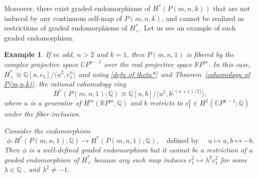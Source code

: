 \documentclass{amsart}
\newtheorem{example}[theorem]{Example}
\newcommand{\thmref}[1]{Theorem~\ref{#1}}
\begin{document}
	Moreover, there exist graded endomorphisms of $H^*(P(m,n,k))$ that are not induced by any continuous self-map of $P(m,n,k)$, and cannot be realized as restrictions of graded endomorphisms of $H^*_{\times}$. Let us see an example of such graded %
endomorphism.
	
	
	\begin{example}
		If $m$ odd, $n>2$ and $k = 1$, then $P(m,n,1)$ is fibered by the complex projective space  $\mathbb{C} P^{n-1}$ over the real projective space $\mathbb{R} P^m$. In this case,  $H^*_\times\cong \mathbb Q[u,c_1]/\langle u^2, c_1^n\rangle$ and using \eqref{defn of theta*}\ and \thmref{cohomology of P(m,n,k)}, the rational cohomology ring $$H^*(P(m,n,1); \mathbb{Q}) \cong \mathbb{Q}[u, b] / \langle u^2, b^{\lfloor (n+1)/2 \rfloor} \rangle,$$ where %
$u$ is a generator of $H^m(\mathbb{R}P^m;\mathbb Q)$ and $b$ restricts to $c_1^2\in H^2(\mathbb CP^{n-1};\mathbb Q)$ under the fiber inclusion. 
		
		Consider the endomorphism
		\[
		\phi \colon H^*(P(m,n,1); \mathbb{Q}) \to H^*(P(m,n,1); \mathbb{Q}), \quad \text{defined by }\quad u \mapsto u,  b \mapsto -b.
		\]
		Then $\phi$ is a well-defined graded endomorphism but it cannot be a restriction of a graded endomorphism of $H^*_\times$ because any such map induces $c_1^2 \mapsto \lambda^2 c_1^2$ for some $\lambda \in \mathbb{Q}$%
, and $\lambda^2 \neq -1$.
	\end{example}
	
\end{document}
